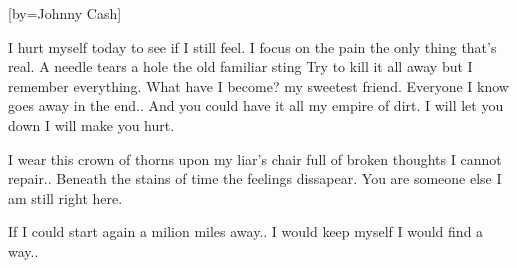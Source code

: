 [by={Johnny Cash}]

\beginverse
I hurt myself today
to see if I still feel.
I focus on the pain
the only thing that's real.
A needle tears a hole
the old familiar sting
Try to kill it all away
but I remember everything.
\endverse
\beginchorus
What have I become?
my sweetest friend.
Everyone I know
goes away in the end..
And you could have it all
my empire of dirt.
I will let you down
I will make you hurt.
\endchorus
\beginverse

I wear this crown of thorns
upon my liar's chair
full of broken thoughts
I cannot repair..
Beneath the stains of time
the feelings dissapear.
You are someone else
I am still right here.
\endverse
\beginchorus

If I could start again
a milion miles away..
I would keep myself
I would find a way..
\endchorus
\endsong
